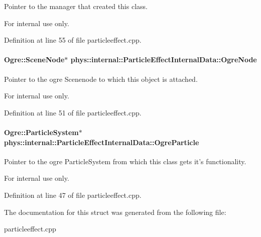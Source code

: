 Pointer to the manager that created this class. 

\begin{DoxyInternal}{For internal use only.}
\end{DoxyInternal}


Definition at line 55 of file particleeffect.cpp.

\hypertarget{structphys_1_1internal_1_1ParticleEffectInternalData_a339dac2408197459041f2524badc619e}{
\paragraph[{OgreNode}]{\setlength{\rightskip}{0pt plus 5cm}Ogre::SceneNode$\ast$ {\bf phys::internal::ParticleEffectInternalData::OgreNode}}\hfill}
\label{d6/d85/structphys_1_1internal_1_1ParticleEffectInternalData_a339dac2408197459041f2524badc619e}


Pointer to the ogre Scenenode to which this object is attached. 

\begin{DoxyInternal}{For internal use only.}
\end{DoxyInternal}


Definition at line 51 of file particleeffect.cpp.

\hypertarget{structphys_1_1internal_1_1ParticleEffectInternalData_a2a9776a843e39608d4a4583e4558a2c0}{
\paragraph[{OgreParticle}]{\setlength{\rightskip}{0pt plus 5cm}Ogre::ParticleSystem$\ast$ {\bf phys::internal::ParticleEffectInternalData::OgreParticle}}\hfill}
\label{d6/d85/structphys_1_1internal_1_1ParticleEffectInternalData_a2a9776a843e39608d4a4583e4558a2c0}


Pointer to the ogre ParticleSystem from which this class gets it's functionality. 

\begin{DoxyInternal}{For internal use only.}
\end{DoxyInternal}


Definition at line 47 of file particleeffect.cpp.



The documentation for this struct was generated from the following file:\begin{DoxyCompactItemize}
\item 
particleeffect.cpp\end{DoxyCompactItemize}
